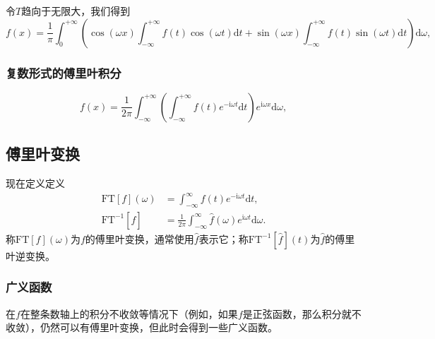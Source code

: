 令$T$趋向于无限大，我们得到
\[
f(x) = \frac{1}{\pi}\int_0^{+\infty} \left(
    \cos(\omega x) \int_{-\infty}^{+\infty} f(t) \cos(\omega t) \mathrm{d}t
    +  \sin(\omega x) \int_{-\infty}^{+\infty} f(t) \sin(\omega t) \mathrm{d}t
\right) \mathrm{d}\omega,
\]

\hypertarget{ux590dux6570ux5f62ux5f0fux7684ux5085ux91ccux53f6ux79efux5206}{%
\subsubsection{复数形式的傅里叶积分}\label{ux590dux6570ux5f62ux5f0fux7684ux5085ux91ccux53f6ux79efux5206}}

\[
f(x) = \frac{1}{2\pi} \int_{-\infty}^{+\infty} \left(\int_{-\infty}^{+\infty} f(t) e^{-\mathrm{i} \omega t} \mathrm{d}t \right) e^{\mathrm{i} \omega x} \mathrm{d} \omega,
\]

\hypertarget{ux5085ux91ccux53f6ux53d8ux6362}{%
\subsection{傅里叶变换}\label{ux5085ux91ccux53f6ux53d8ux6362}}

现在定义定义
\[
\begin{aligned}
    \mathrm{FT}[f](\omega) &= \int_{-\infty}^\infty f(t) e^{-\mathrm{i}\omega t} \mathrm{d}t, \\
    \mathrm{FT}^{-1}[\hat{f}] &= \frac{1}{2\pi} \int_{-\infty}^\infty \hat{f}(\omega) e^{\mathrm{i}\omega t} \mathrm{d}\omega.
\end{aligned}
\]
称$\mathrm{FT}[f](\omega)$为$f$的傅里叶变换，通常使用$\hat{f}$表示它；称$\mathrm{FT}^{-1}[\hat{f}](t)$为$\hat{f}$的傅里叶逆变换。

\hypertarget{ux5e7fux4e49ux51fdux6570}{%
\subsubsection{广义函数}\label{ux5e7fux4e49ux51fdux6570}}

在$f$在整条数轴上的积分不收敛等情况下（例如，如果$f$是正弦函数，那么积分就不收敛），仍然可以有傅里叶变换，但此时会得到一些广义函数。

